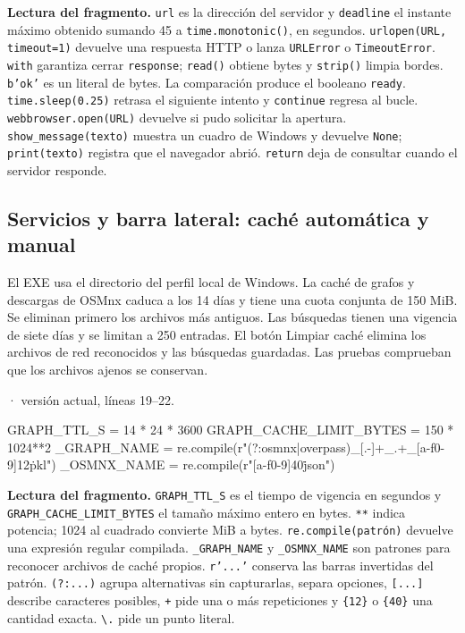 \documentclass[11pt,a4paper]{article}
\begin{document}
\textbf{Lectura del fragmento.} \texttt{url} es la dirección del servidor y \texttt{deadline} el instante máximo obtenido sumando 45 a \texttt{time.monotonic()}, en segundos. \texttt{urlopen(URL, timeout=1)} devuelve una respuesta HTTP o lanza \texttt{URLError} o \texttt{TimeoutError}. \texttt{with} garantiza cerrar \texttt{response}; \texttt{read()} obtiene bytes y \texttt{strip()} limpia bordes. \texttt{b'ok'} es un literal de bytes. La comparación produce el booleano \texttt{ready}. \texttt{time.sleep(0.25)} retrasa el siguiente intento y \texttt{continue} regresa al bucle. \texttt{webbrowser.open(URL)} devuelve si pudo solicitar la apertura. \texttt{show\_message(texto)} muestra un cuadro de Windows y devuelve \texttt{None}; \texttt{print(texto)} registra que el navegador abrió. \texttt{return} deja de consultar cuando el servidor responde.


\subsection{Servicios y barra lateral: caché automática y manual}
El EXE usa el directorio del perfil local de Windows. La caché de grafos y descargas de OSMnx caduca a los 14 días y tiene una cuota conjunta de 150 MiB. Se eliminan primero los archivos más antiguos. Las búsquedas tienen una vigencia de siete días y se limitan a 250 entradas. El botón Limpiar caché elimina los archivos de red reconocidos y las búsquedas guardadas. Las pruebas comprueban que los archivos ajenos se conservan.

\smallskip
{\footnotesize\texttt{} · versión actual, líneas 19--22.}\par
\begin{Codigo}[firstnumber=19]
GRAPH_TTL_S = 14 * 24 * 3600
GRAPH_CACHE_LIMIT_BYTES = 150 * 1024**2
_GRAPH_NAME = re.compile(r"(?:osmnx|overpass)_[\w.-]+_.+_[a-f0-9]{12}\.pkl")
_OSMNX_NAME = re.compile(r"[a-f0-9]{40}\.json")
\end{Codigo}

\textbf{Lectura del fragmento.} \texttt{GRAPH\_TTL\_S} es el tiempo de vigencia en segundos y \texttt{GRAPH\_CACHE\_LIMIT\_BYTES} el tamaño máximo entero en bytes. \texttt{**} indica potencia; 1024 al cuadrado convierte MiB a bytes. \texttt{re.compile(patrón)} devuelve una expresión regular compilada. \texttt{\_GRAPH\_NAME} y \texttt{\_OSMNX\_NAME} son patrones para reconocer archivos de caché propios. \texttt{r'...'} conserva las barras invertidas del patrón. \texttt{(?:...)} agrupa alternativas sin capturarlas, \texttt{\textbar{}} separa opciones, \texttt{[...]} describe caracteres posibles, \texttt{+} pide una o más repeticiones y \texttt{\{12\}} o \texttt{\{40\}} una cantidad exacta. \texttt{\textbackslash{}.} pide un punto literal.
\end{document}
